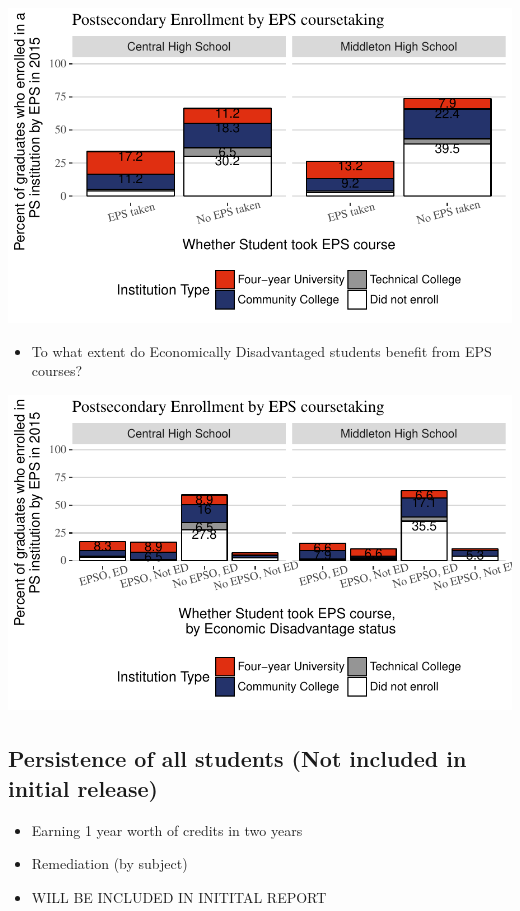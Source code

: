 \documentclass[11pt,]{article}
\providecommand{\tightlist}{%
  \setlength{\itemsep}{0pt}\setlength{\parskip}{0pt}}
\begin{document}
\includegraphics{20170419_PSWRR_files/figure-latex/Figure9d-1.pdf}

\begin{itemize}
\tightlist
\item
  To what extent do Economically Disadvantaged students benefit from EPS
  courses?
\end{itemize}

\includegraphics{20170419_PSWRR_files/figure-latex/Figure9e-1.pdf}

\newpage

\subsection{Persistence of all students (Not included in initial
release)}\label{persistence-of-all-students-not-included-in-initial-release}

\begin{itemize}
\tightlist
\item
  Earning 1 year worth of credits in two years
\item
  Remediation (by subject)
\item
  WILL BE INCLUDED IN INITITAL REPORT
\end{itemize}
\end{document}
